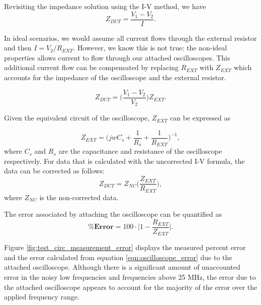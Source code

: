 \par Revisiting the impedance solution using the I-V method, we have
\begin{equation}
    Z_{DUT} = \frac{V_1 - V_2}{I}.
\end{equation}

\noindent In ideal scenarios, we would assume all current flows through the external resistor and then $I = V_2 / R_{EXT}$. However, we know this is not true: the non-ideal properties allows current to flow through our attached oscilloscopes. This additional current flow can be compensated by replacing $R_{EXT}$ with $Z_{EXT}$ which accounts for the impedance of the oscilloscope and the external resistor. 

\begin{equation}
    Z_{DUT} = \bigg(\frac{V_1 - V_2}{V_2}\bigg)Z_{EXT}.
    \label{eqn:corrected_IV}
\end{equation}

\par Given the equivalent circuit of the oscilloscope, $Z_{EXT}$ can be expressed as

\begin{equation}
    Z_{EXT} = \bigg(jwC_{s}+\frac{1}{R_{s}}+\frac{1}{R_{EXT}}\bigg)^{-1},
    \label{eqn:corrected_Rext}
\end{equation}
\noindent where $C_{s}$ and $R_{s}$ are the capacitance and resistance of the oscilloscope respectively. For data that is calculated with the uncorrected I-V formula, the data can be corrected as follows:
\begin{equation}
    Z_{DUT} = Z_{NC}\bigg(\frac{Z_{EXT}}{R_{EXT}}\bigg),
\end{equation}
\noindent where $Z_{NC}$ is the non-corrected data. 

\par The error associated by attaching the oscilloscope can be quantified as
\begin{equation}
    \pmb{\%} \textbf{Error} = 100 \cdot \bigg| 1 - \frac{R_{EXT}}{Z_{EXT}}\bigg|.
    \label{eqn:oscilloscope_error}
\end{equation}

\par Figure \ref{fig:test_circ_measurement_error} displays the measured percent error and the error calculated from equation \ref{eqn:oscilloscope_error} due to the attached oscilloscope. Although there is a significant amount of unaccounted error in the noisy low frequencies and frequencies above 25 MHz, the error due to the attached oscilloscope appears to account for the majority of the error over the applied frequency range.

